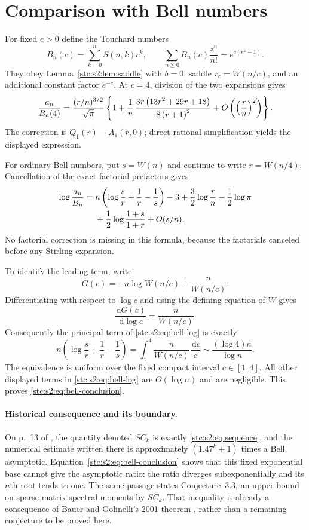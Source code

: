 \documentclass[11pt,letterpaper]{article}
\numberwithin{equation}{section}
\theoremstyle{remark}\newtheorem{remark}[theorem]{Remark}
\newcommand{\dd}{\,\mathrm d}
\begin{document}
\section{Comparison with Bell numbers}\label{stc:s2:sec:bell}
For fixed $c>0$ define the Touchard numbers
\[
 B_n(c)=\sum_{k=0}^nS(n,k)c^k,
 \qquad \sum_{n\ge0}B_n(c)\frac{z^n}{n!}=e^{c(e^z-1)}.
\]
They obey Lemma~\ref{stc:s2:lem:saddle} with $b=0$, saddle $r_c=W(n/c)$, and an additional constant factor $e^{-c}$. At $c=4$, division of the two expansions gives
\begin{equation}\label{stc:s2:eq:bell4}
 \frac{a_n}{B_n(4)}=\frac{(r/n)^{3/2}}{\sqrt\pi}
 \left\{1+\frac1n\,\frac{3 r \left(13 r^{2} + 29 r + 18\right)}{8 \left(r + 1\right)^{2}}+O\left(\left(\frac rn\right)^2\right)\right\}.
\end{equation}
The correction is $Q_1(r)-A_1(r,0)$; direct rational simplification yields the displayed expression.

For ordinary Bell numbers, put $s=W(n)$ and continue to write $r=W(n/4)$. Cancellation of the exact factorial prefactors gives
\begin{align}
 \log\frac{a_n}{B_n}
 ={}&n\left(\log\frac sr+\frac1r-\frac1s\right)-3
 +\frac32\log\frac rn-\frac12\log\pi\notag\\
 &+\frac12\log\frac{1+s}{1+r}+O(s/n).
 \label{stc:s2:eq:bell-log}
\end{align}
No factorial correction is missing in this formula, because the factorials canceled before any Stirling expansion.

To identify the leading term, write
\[
 G(c)=-n\log W(n/c)+\frac{n}{W(n/c)}.
\]
Differentiating with respect to $\log c$ and using the defining equation of $W$ gives
\[
 \frac{\dd G(c)}{\dd\log c}=\frac n{W(n/c)}.
\]
Consequently the principal term of \eqref{stc:s2:eq:bell-log} is exactly
\begin{equation}\label{stc:s2:eq:bell-integral}
 n\left(\log\frac sr+\frac1r-\frac1s\right)
 =\int_1^4\frac n{W(n/c)}\frac{\dd c}{c}
 \sim\frac{(\log4)n}{\log n}.
\end{equation}
The equivalence is uniform over the fixed compact interval $c\in[1,4]$. All other displayed terms in \eqref{stc:s2:eq:bell-log} are $O(\log n)$ and are negligible. This proves \eqref{stc:s2:eq:bell-conclusion}.

\paragraph{Historical consequence and its boundary.}
On p.~13 of \cite{spiridonov}, the quantity denoted $SC_k$ is exactly \eqref{stc:s2:eq:sequence}, and the numerical estimate written there is approximately $(1.47^k+1)$ times a Bell asymptotic. Equation~\eqref{stc:s2:eq:bell-conclusion} shows that this fixed exponential base cannot give the asymptotic ratio: the ratio diverges subexponentially and its $n$th root tends to one. The same passage states Conjecture~3.3, an upper bound on sparse-matrix spectral moments by $SC_k$. That inequality is already a consequence of Bauer and Golinelli's 2001 theorem \cite{bauer}, rather than a remaining conjecture to be proved here.
\end{document}
